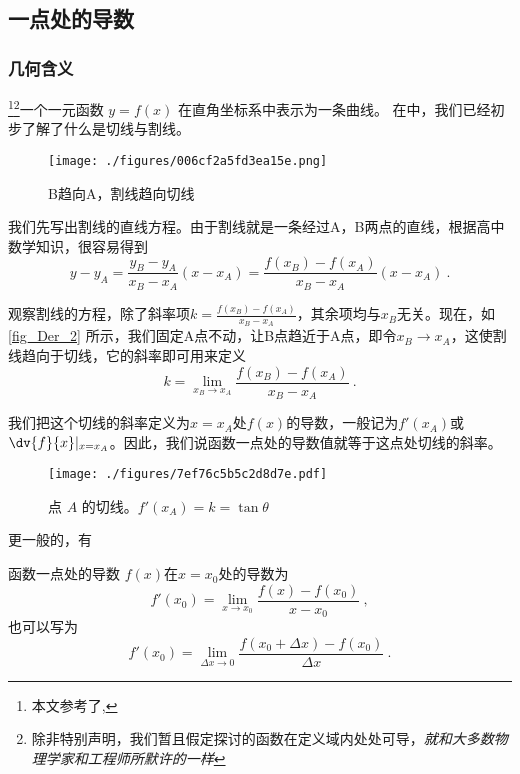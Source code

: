 

\subsection{一点处的导数}
\subsubsection{几何含义}
\footnote{本文参考了\cite{同济高},\cite{Thomas}}\footnote{除非特别声明，我们暂且假定探讨的函数在定义域内处处可导，\textsl{就和大多数物理学家和工程师所默许的一样}}一个一元函数 $y = f(x)$ 在直角坐标系中表示为一条曲线。 在中，我们已经初步了解了什么是切线与割线。

\begin{figure}[ht]
\centering
\texttt{[image: ./figures/006cf2a5fd3ea15e.png]}
\caption{B趋向A，割线趋向切线} \label{fig_Der_2}
\end{figure}

我们先写出割线的直线方程。由于割线就是一条经过A，B两点的直线，根据高中数学知识，很容易得到
\begin{equation}
y-y_A=\frac{y_B-y_A}{x_B-x_A}(x-x_A)=\frac{f(x_B)-f(x_A)}{x_B-x_A}(x-x_A)~.
\end{equation}

观察割线的方程，除了斜率项$k=\frac{f(x_B)-f(x_A)}{x_B-x_A}$，其余项均与$x_B$无关。现在，如\autoref{fig_Der_2} 所示，我们固定A点不动，让B点趋近于A点，即令$x_B\rightarrow x_A$，这使割线趋向于切线，它的斜率即可用来定义
\begin{equation}\label{eq_Der_3}
k=\lim_{x_B\to x_A}\frac{f(x_B)-f(x_A)}{x_B-x_A}~.
\end{equation}

我们把这个切线的斜率定义为$x=x_A$处$f(x)$的导数，一般记为$f'(x_A)$或$\dv{f}{x}|_{x=x_A}$。因此，我们说函数一点处的导数值就等于这点处切线的斜率。

\begin{figure}[ht]
\centering
\texttt{[image: ./figures/7ef76c5b5c2d8d7e.pdf]}
\caption{点 $A$ 的切线。$f'(x_A)=k=\tan \theta$} \label{fig_Der_20}
\end{figure}

更一般的，有
\begin{definition}{函数一点处的导数}
$f(x)$在$x=x_0$处的导数为
\begin{equation}
f'(x_0)=\lim_{x\to x_0}\frac{f(x)-f(x_0)}{x-x_0}~,
\end{equation}
也可以写为
\begin{equation}\label{eq_Der_2}
f'(x_0)=\lim_{\Delta x \to 0}\frac{f(x_0+\Delta x)-f(x_0)}{\Delta x}~.
\end{equation}
\end{definition}

